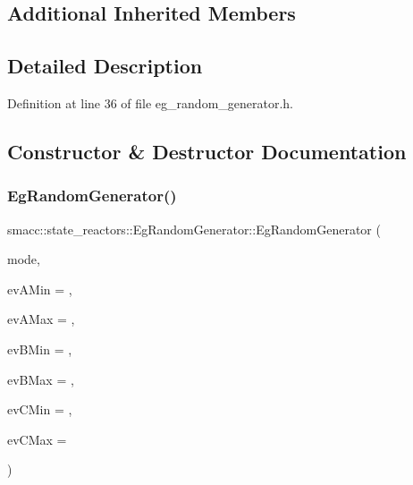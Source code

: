 \subsection*{Additional Inherited Members}


\subsection{Detailed Description}


Definition at line 36 of file eg\+\_\+random\+\_\+generator.\+h.



\subsection{Constructor \& Destructor Documentation}
\mbox{\label{classsmacc_1_1state__reactors_1_1EgRandomGenerator_a091663782d496c7fd00e4d73ad38e011}} 
\subsubsection{\texorpdfstring{Eg\+Random\+Generator()}{EgRandomGenerator()}}
{\footnotesize\ttfamily smacc\+::state\+\_\+reactors\+::\+Eg\+Random\+Generator\+::\+Eg\+Random\+Generator (\begin{DoxyParamCaption}\item[{\hyperlink{namespacesmacc_1_1state__reactors_a038f8e362ad6d35494c940ee4c97a52e}{Random\+Generate\+Reactor\+Mode}}]{mode,  }\item[{double}]{ev\+A\+Min = {},  }\item[{double}]{ev\+A\+Max = {},  }\item[{double}]{ev\+B\+Min = {},  }\item[{double}]{ev\+B\+Max = {},  }\item[{double}]{ev\+C\+Min = {},  }\item[{double}]{ev\+C\+Max = {} }\end{DoxyParamCaption})}



